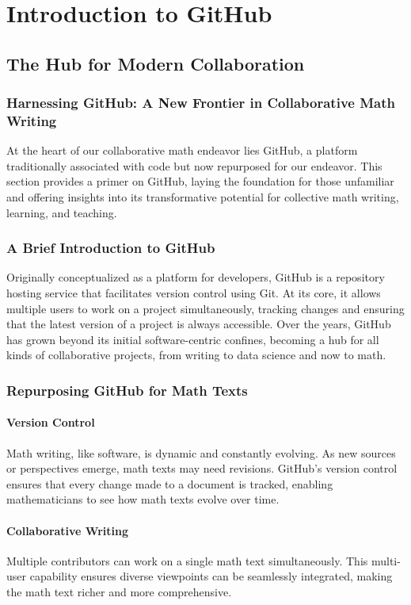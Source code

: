 \documentclass[a4paper,12pt]{book}
\begin{document}
\chapter{Introduction to GitHub}
\section*{The Hub for Modern Collaboration}
\subsection*{Harnessing GitHub: A New Frontier in Collaborative Math Writing}
At the heart of our collaborative math endeavor lies GitHub, a platform traditionally associated with code but now repurposed for our endeavor. This section provides a primer on GitHub, laying the foundation for those unfamiliar and offering insights into its transformative potential for collective math writing, learning, and teaching.

\subsection*{A Brief Introduction to GitHub}
Originally conceptualized as a platform for developers, GitHub is a repository hosting service that facilitates version control using Git. At its core, it allows multiple users to work on a project simultaneously, tracking changes and ensuring that the latest version of a project is always accessible. Over the years, GitHub has grown beyond its initial software-centric confines, becoming a hub for all kinds of collaborative projects, from writing to data science and now to math.

\subsection*{Repurposing GitHub for Math Texts}
\subsubsection*{Version Control}
Math writing, like software, is dynamic and constantly evolving. As new sources or perspectives emerge, math texts may need revisions. GitHub's version control ensures that every change made to a document is tracked, enabling mathematicians to see how math texts evolve over time.

\subsubsection*{Collaborative Writing}
Multiple contributors can work on a single math text simultaneously. This multi-user capability ensures diverse viewpoints can be seamlessly integrated, making the math text richer and more comprehensive.
\end{document}
